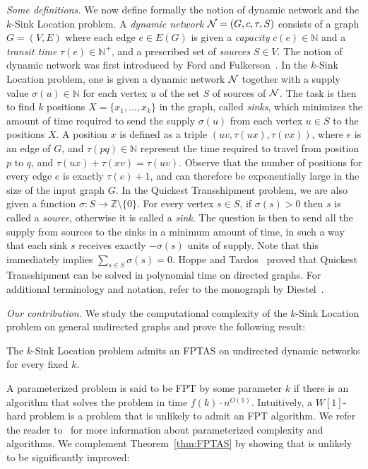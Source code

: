 \documentclass[a4paper,10pt]{llncs}
\begin{document}
{\em Some definitions.} We now define formally the notion of dynamic network and the $k$-{\sc Sink Location} problem. A {\em dynamic network} ${\cal N} = (G, c, \tau, S)$ consists of a graph $G=(V,E)$ where each edge $e\in E(G)$ is given a {\em capacity} $c(e)\in\mathbb{N}$ and a {\em transit time} $\tau(e)\in \mathbb{N}^+$, and a prescribed set of {\em sources} $S\in V$. The notion of dynamic network was first introduced by Ford and Fulkerson~\cite{FF62}. In the $k$-{\sc Sink Location} problem, one is given a dynamic network ${\cal N}$ together with a supply value $\sigma(u)\in \mathbb{N}$ for each vertex $u$ of the set $S$ of sources of ${\cal N}$. The task is then to find $k$ positions $X=\{x_1,\ldots,x_k\}$ in the graph, called {\em sinks}, which minimizes the amount of time required to send the supply $\sigma(u)$ from each vertex $u\in S$ to the positions $X$. A position $x$ is defined as a triple $(uv,\tau(ux),\tau(vx))$, where $e$ is an edge of $G$, and $\tau(pq)\in\mathbb{N}$ represent the time required to travel from position $p$ to $q$, and $\tau(ux)+\tau(xv)=\tau(uv)$. Observe that the number of positions for every edge $e$ is exactly $\tau(e)+1$, and can therefore be exponentially large in the size of the input graph $G$.
In the {\sc Quickest Transshipment} problem, we are also given a function $\sigma: S \rightarrow \mathbb{Z}\setminus \{0\}$. For every vertex $s\in S$, if $\sigma(s) > 0$ then $s$ is called a {\em source}, otherwise it is called a {\em sink}. The question is then to send all the supply from sources to the sinks in a minimum amount of time, in such a way that each sink $s$ receives exactly $-\sigma(s)$ units of supply. Note that this immediately implies $\sum_{s\in S}\sigma(s)=0$. Hoppe and Tardos~\cite{HT00} proved that {\sc Quickest Transshipment} can be solved in polynomial time on directed graphs.
For additional terminology and notation, refer to the monograph by Diestel~\cite{Die05}.

{\em Our contribution.} We study the computational complexity of the $k$-{\sc Sink Location} problem on general undirected graphs and prove the following result:

\begin{theorem}
\label{thm:FPTAS}
The $k$-{\sc Sink Location} problem admits an FPTAS on undirected dynamic networks for every fixed $k$. 
\end{theorem}

A parameterized problem is said to be FPT  by some parameter $k$ if there is an algorithm that solves the problem in time $f(k)\cdot n^{O(1)}$. Intuitively, a $W[1]$-hard problem is a problem that is unlikely to admit an FPT algorithm. We refer the reader to~\cite{FG06,Nie06} for more information about parameterized complexity and algorithms.
We complement Theorem~\ref{thm:FPTAS} by showing that is unlikely to be significantly improved:
\end{document}
